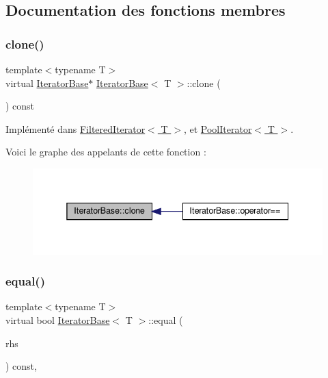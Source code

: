 \subsection{Documentation des fonctions membres}
\mbox{\label{class_iterator_base_a541fdf8cc48f31c8ddfdc3f319a37100}} 
\subsubsection{\texorpdfstring{clone()}{clone()}}
{\footnotesize\ttfamily template$<$typename T$>$ \\
virtual \hyperlink{class_iterator_base}{Iterator\+Base}$\ast$ \hyperlink{class_iterator_base}{Iterator\+Base}$<$ T $>$\+::clone (\begin{DoxyParamCaption}{ }\end{DoxyParamCaption}) const\hspace{0.3cm}{\ttfamily [pure virtual]}}



Implémenté dans \hyperlink{class_filtered_iterator_a79d512a43aa4d31caf26908e93130b9d}{Filtered\+Iterator$<$ T $>$}, et \hyperlink{class_pool_iterator_ae39cdb4bbb84e88cf0d9009e7bdae586}{Pool\+Iterator$<$ T $>$}.

Voici le graphe des appelants de cette fonction \+:
\nopagebreak
\begin{figure}[H]
\begin{center}
\leavevmode
\includegraphics[width=338pt]{class_iterator_base_a541fdf8cc48f31c8ddfdc3f319a37100_icgraph}
\end{center}
\end{figure}
\mbox{\label{class_iterator_base_a08430515a17384d098eb62ecce1b64c6}} 
\subsubsection{\texorpdfstring{equal()}{equal()}}
{\footnotesize\ttfamily template$<$typename T$>$ \\
virtual bool \hyperlink{class_iterator_base}{Iterator\+Base}$<$ T $>$\+::equal (\begin{DoxyParamCaption}\item[{const \hyperlink{class_iterator_base}{Iterator\+Base}$<$ T $>$ \&}]{rhs }\end{DoxyParamCaption}) const\hspace{0.3cm}{\ttfamily [protected]}, {}}



